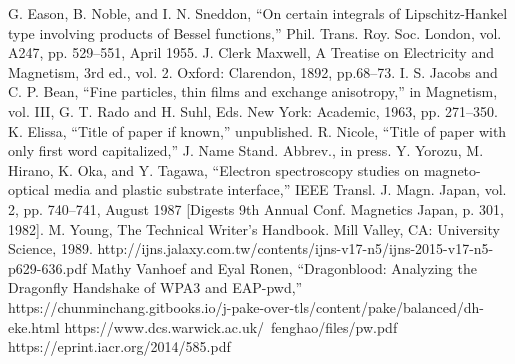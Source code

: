 \documentclass[journal]{IEEEtran}
\begin{document}



\begin{thebibliography}{00}
 G. Eason, B. Noble, and I. N. Sneddon, ``On certain integrals of Lipschitz-Hankel type involving products of Bessel functions,'' Phil. Trans. Roy. Soc. London, vol. A247, pp. 529--551, April 1955.
 J. Clerk Maxwell, A Treatise on Electricity and Magnetism, 3rd ed., vol. 2. Oxford: Clarendon, 1892, pp.68--73.
 I. S. Jacobs and C. P. Bean, ``Fine particles, thin films and exchange anisotropy,'' in Magnetism, vol. III, G. T. Rado and H. Suhl, Eds. New York: Academic, 1963, pp. 271--350.
 K. Elissa, ``Title of paper if known,'' unpublished.
 R. Nicole, ``Title of paper with only first word capitalized,'' J. Name Stand. Abbrev., in press.
 Y. Yorozu, M. Hirano, K. Oka, and Y. Tagawa, ``Electron spectroscopy studies on magneto-optical media and plastic substrate interface,'' IEEE Transl. J. Magn. Japan, vol. 2, pp. 740--741, August 1987 [Digests 9th Annual Conf. Magnetics Japan, p. 301, 1982].
 M. Young, The Technical Writer's Handbook. Mill Valley, CA: University Science, 1989.
 http://ijns.jalaxy.com.tw/contents/ijns-v17-n5/ijns-2015-v17-n5-p629-636.pdf
 Mathy Vanhoef and Eyal Ronen, ``Dragonblood: Analyzing the Dragonfly Handshake of WPA3 and EAP-pwd,''
 https://chunminchang.gitbooks.io/j-pake-over-tls/content/pake/balanced/dh-eke.html
 https://www.dcs.warwick.ac.uk/~fenghao/files/pw.pdf
 https://eprint.iacr.org/2014/585.pdf
\end{thebibliography}
\vspace{12pt}
\end{document}
